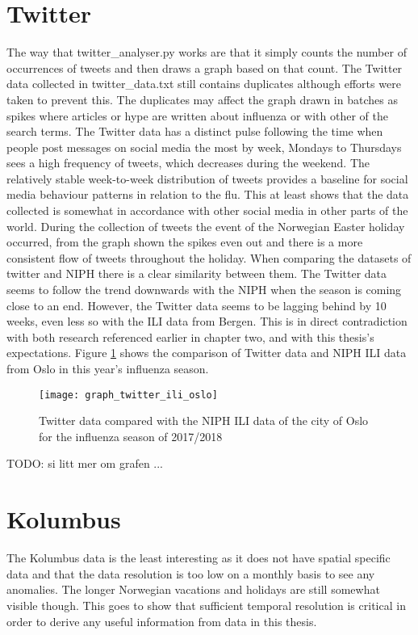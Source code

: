 \section{Twitter}
The way that twitter\_analyser.py works are that it simply counts the number of occurrences of tweets and then draws a graph based on that count. The Twitter data collected in twitter\_data.txt still contains duplicates although efforts were taken to prevent this. The duplicates may affect the graph drawn in batches as spikes where articles or hype are written about influenza or with other of the search terms. The Twitter data has a distinct pulse following the time when people post messages on social media the most by week\cite{socialTrend}, Mondays to Thursdays sees a high frequency of tweets, which decreases during the weekend. The relatively stable week-to-week distribution of tweets provides a baseline for social media behaviour patterns in relation to the flu. This at least shows that the data collected is somewhat in accordance with other social media in other parts of the world. During the collection of tweets the event of the Norwegian Easter holiday occurred, from the graph shown the spikes even out and there is a more consistent flow of tweets throughout the holiday.
When comparing the datasets of twitter and NIPH there is a clear similarity between them. The Twitter data seems to follow the trend downwards with the NIPH when the season is coming close to an end. However, the Twitter data seems to be lagging behind by 10 weeks, even less so with the ILI data from Bergen. This is in direct contradiction with both research referenced earlier in chapter two, and with this thesis's expectations. Figure \ref{fig:graph_twitter_ili_oslo} shows the comparison of Twitter data and NIPH ILI data from Oslo in this year's influenza season.

\begin{figure}[!htb]
\texttt{[image: graph\_twitter\_ili\_oslo]}
\centering
\caption{Twitter data compared with the NIPH ILI data of the city of Oslo for the influenza season of 2017/2018}
\label{fig:graph_twitter_ili_oslo}
\end{figure}

TODO: si litt mer om grafen ...







\section{Kolumbus}
The Kolumbus data is the least interesting as it does not have spatial specific data and that the data resolution is too low on a monthly basis to see any anomalies. The longer Norwegian vacations and holidays are still somewhat visible though. This goes to show that sufficient temporal resolution is critical in order to derive any useful information from data in this thesis.




